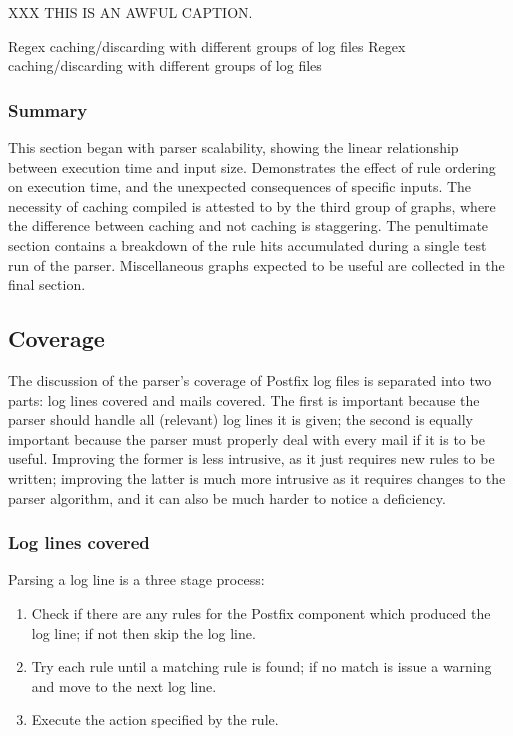 XXX THIS IS AN AWFUL CAPTION\@.

{Regex caching/discarding with different groups of log files}
{Regex caching/discarding with different groups of log files}


\subsubsection{Summary}

This section began with parser scalability, showing the linear relationship
between execution time and input size.  Demonstrates the effect of rule
ordering on execution time, and the unexpected consequences of specific
inputs.  The necessity of caching compiled \regexes{} is attested to by the
third group of graphs, where the difference between caching and not caching
is staggering.  The penultimate section contains a breakdown of the rule
hits accumulated during a single test run of the parser.  Miscellaneous
graphs expected to be useful are collected in the final section.  

\subsection{Coverage}

\label{parsing coverage}

The discussion of the parser's coverage of Postfix log files is separated
into two parts: log lines covered and mails covered.  The first is
important because the parser should handle all (relevant) log lines it is
given; the second is equally important because the parser must properly
deal with every mail if it is to be useful.  Improving the former is
less intrusive, as it just requires new rules to be written; improving the
latter is much more intrusive as it requires changes to the parser
algorithm, and it can also be much harder to notice a deficiency.

\subsubsection{Log lines covered}

\label{log-lines-covered}

Parsing a log line is a three stage process:

\begin{enumerate}

    \item Check if there are any rules for the Postfix component which
        produced the log line; if not then skip the log line.

    \item Try each rule until a matching rule is found; if no match is
        issue a warning and move to the next log line.

    \item Execute the action specified by the rule.

\end{enumerate}

